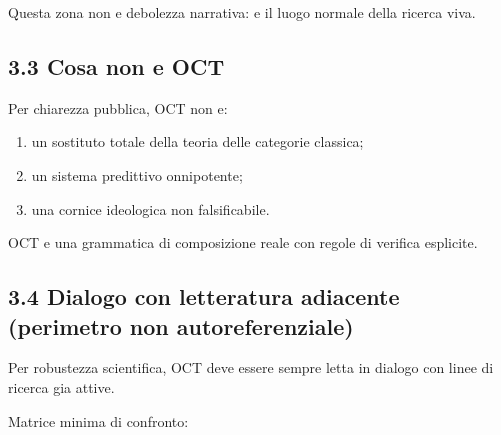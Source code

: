 Questa zona non e debolezza narrativa: e il luogo normale della ricerca viva.

\subsection{3.3 Cosa non e OCT}

Per chiarezza pubblica, OCT non e:

\begin{enumerate}
\def\labelenumi{\arabic{enumi}.}
\tightlist
\item
  un sostituto totale della teoria delle categorie classica;
\item
  un sistema predittivo onnipotente;
\item
  una cornice ideologica non falsificabile.
\end{enumerate}

OCT e una grammatica di composizione reale con regole di verifica esplicite.

\subsection{3.4 Dialogo con letteratura adiacente (perimetro non autoreferenziale)}

Per robustezza scientifica, OCT deve essere sempre letta in dialogo con linee di ricerca gia attive.

Matrice minima di confronto:

